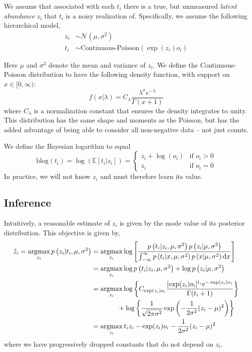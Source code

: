 \documentclass[11pt]{article}
\newcommand{\argmax}{\operatornamewithlimits{argmax}}
\begin{document}
We assume that associated with each $t_i$ there is a true, but unmeasured \emph{latent abundance} $z_i$ that $t_i$ is a noisy realization of. Specifically, we assume the following hierarchical model,
\begin{align*}
z_i &\sim \mathcal{N}\left(\mu, \sigma^2\right) \\
t_i & \sim \textrm{Continuous-Poisson}(\exp(z_i)o_i)
\end{align*}

Here $\mu$ and $\sigma^2$ denote the mean and variance of $z_i$. We define the Continuous-Poisson distribution to have the following density function, with support on $x \in [0, \infty)$: 
\[
f(x|\lambda) = C_{\lambda}\frac{ \lambda^x e^{-\lambda}}{\Gamma(x + 1)}
\]
where $C_\lambda$ is a normalization constant that ensures the density integrates to unity. This distribution has the same shape and moments as the Poisson, but has the added advantage of being able to consider all non-negative data -- not just counts.

We define the Bayesian logarithm to equal
\[
\textrm{blog}(t_i) = \log(\mathbb{E}[t_i|z_i]) = 
\begin{cases}
z_i + \log(o_i) & \mbox{if } o_i > 0 \\
z_i  & \mbox{if } o_i = 0
\end{cases}
\]
In practice, we will not know $z_i$ and must therefore learn its value.

\subsection{Inference}

Intuitively, a reasonable estimate of $z_i$ is given by the mode value of its posterior distribution. This objective is given by,
\begin{align*}
\hat{z}_i = \argmax_{z_i} p\left(z_i|t_i,\mu, \sigma^2 \right) & = \argmax_{z_i} \log \left[ \frac{ p\left(t_i|z_i,\mu, \sigma^2 \right)p\left(z_i |\mu, \sigma^2 \right) }{ \int_{-\infty}^{\infty} p\left(t_i|x,\mu, \sigma^2 \right)p\left(x |\mu, \sigma^2 \right) \textrm{d}x } \right] \\
& = \argmax_{z_i} \log  p\left(t_i|z_i,\mu, \sigma^2 \right) + \log p\left(z_i |\mu, \sigma^2 \right)  \\
& = \argmax_{z_i} \log\left\{ C_{\exp(z_i)o_i} \frac{ [\exp(z_i)o_i]^{t_i} e^{-\exp(z_i)o_i}}{\Gamma(t_i + 1)}\right\} \\ 
& \hspace{13.5mm} + \log\left\{ \frac{1}{\sqrt{2\pi\sigma^2}} \exp\left( -\frac{1}{2\sigma^2}(z_i - \mu)^2 \right) \right\} \\
& = \argmax_{z_i} t_i z_i - \exp(z_i)o_i -\frac{1}{2\sigma^2}(z_i - \mu)^2 
\end{align*}
where we have progressively dropped constants that do not depend on $z_i$. 
\end{document}
